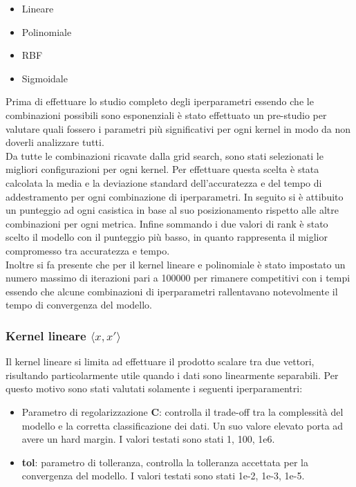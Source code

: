 \begin{itemize}
    \item Lineare
    \item Polinomiale
    \item RBF
    \item Sigmoidale
\end{itemize}

Prima di effettuare lo studio completo degli iperparametri essendo che le 
combinazioni possibili sono esponenziali è stato effettuato un pre-studio
per valutare quali fossero i parametri più significativi per ogni kernel in modo
da non doverli analizzare tutti.\\

Da tutte le combinazioni ricavate dalla grid search, sono stati selezionati le 
migliori configurazioni per ogni kernel. 
Per effettuare questa scelta è stata calcolata la media e la deviazione standard 
dell'accuratezza e del tempo di addestramento per ogni combinazione di iperparametri.
In seguito si è attibuito un punteggio ad ogni casistica in base al suo 
posizionamento rispetto alle altre combinazioni per ogni metrica.
Infine sommando i due valori di rank è stato scelto il modello con il punteggio
più basso, in quanto rappresenta il miglior compromesso tra accuratezza e tempo.\\

Inoltre si fa presente che per il kernel lineare e polinomiale è stato impostato
un numero massimo di iterazioni pari a 100000 per rimanere competitivi con i tempi
essendo che alcune combinazioni di iperparametri rallentavano notevolmente il tempo 
di convergenza del modello.

\subsubsection*{Kernel lineare $\langle x,x'\rangle$}
    Il kernel lineare si limita ad effettuare il prodotto scalare tra due vettori,
    risultando particolarmente utile quando i dati sono linearmente separabili.
    Per questo motivo sono stati valutati solamente i seguenti iperparamentri:
    \begin{itemize}
        \item Parametro di regolarizzazione \textbf{C}: controlla il trade-off tra
              la complessità del modello e la corretta classificazione dei dati.
              Un suo valore elevato porta ad avere un hard margin.
              I valori testati sono stati 1, 100, 1e6.
        \item \textbf{tol}: parametro di tolleranza, controlla la tolleranza
              accettata per la convergenza del modello.
              I valori testati sono stati 1e-2, 1e-3, 1e-5.
    \end{itemize}

